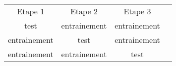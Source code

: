 \begin{center}
\renewcommand{\arraystretch}{4}
\begin{tabular}{c | c || c || c}
  Etape 1& Etape 2 & Etape 3\\
  \cellcolor{Periwinkle}test & \cellcolor{NavyBlue}entrainement & \cellcolor{NavyBlue}entrainement\\
  \cellcolor{NavyBlue}entrainement & \cellcolor{Periwinkle}test & \cellcolor{NavyBlue}entrainement\\
  \cellcolor{NavyBlue}entrainement & \cellcolor{NavyBlue}entrainement & \cellcolor{Periwinkle}test\\
\end{tabular}
\end{center}
